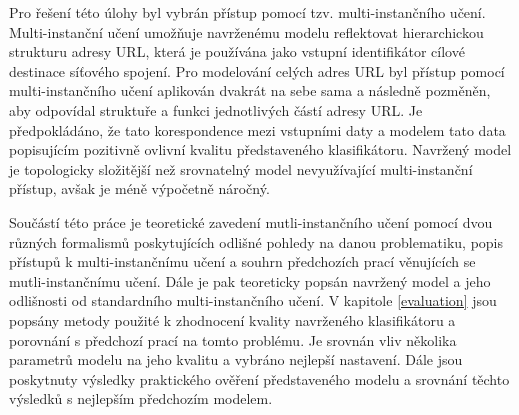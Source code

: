 Pro řešení této úlohy byl vybrán přístup pomocí tzv. multi-instančního učení. Multi-instanční učení umožňuje navrženému modelu reflektovat hierarchickou strukturu adresy URL, která je používána jako vstupní identifikátor cílové destinace síťového spojení. Pro modelování celých adres URL byl přístup pomocí multi-instančního učení aplikován dvakrát na sebe sama a následně pozměněn, aby odpovídal struktuře a funkci jednotlivých částí adresy URL. Je předpokládáno, že tato korespondence mezi vstupními daty a modelem tato data popisujícím pozitivně ovlivní kvalitu představeného klasifikátoru. Navržený model je topologicky složitější než srovnatelný model nevyužívající multi-instanční přístup, avšak je méně výpočetně náročný.

Součástí této práce je teoretické zavedení mutli-instančního učení pomocí dvou různých formalismů poskytujících odlišné pohledy na danou problematiku, popis přístupů k multi-instančnímu učení a souhrn předchozích prací věnujících se mutli-instančnímu učení. Dále je pak teoreticky popsán navržený model a jeho odlišnosti od standardního multi-instančního učení. V kapitole \ref{evaluation} jsou popsány metody použité k zhodnocení kvality navrženého klasifikátoru a porovnání s předchozí prací na tomto problému. Je srovnán vliv několika parametrů modelu na jeho kvalitu a vybráno nejlepší nastavení. Dále jsou poskytnuty výsledky praktického ověření představeného modelu a srovnání těchto výsledků s nejlepším předchozím modelem.
